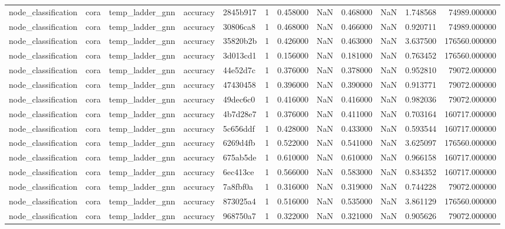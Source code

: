 \begin{tabular}{lllllrrrrrrr}
node_classification & cora & temp_ladder_gnn & accuracy & 2845b917 & 1 & 0.458000 & NaN & 0.468000 & NaN & 1.748568 & 74989.000000 \\
node_classification & cora & temp_ladder_gnn & accuracy & 30806ca8 & 1 & 0.468000 & NaN & 0.466000 & NaN & 0.920711 & 74989.000000 \\
node_classification & cora & temp_ladder_gnn & accuracy & 35820b2b & 1 & 0.426000 & NaN & 0.463000 & NaN & 3.637500 & 176560.000000 \\
node_classification & cora & temp_ladder_gnn & accuracy & 3d013cd1 & 1 & 0.156000 & NaN & 0.181000 & NaN & 0.763452 & 176560.000000 \\
node_classification & cora & temp_ladder_gnn & accuracy & 44e52d7c & 1 & 0.376000 & NaN & 0.378000 & NaN & 0.952810 & 79072.000000 \\
node_classification & cora & temp_ladder_gnn & accuracy & 47430458 & 1 & 0.396000 & NaN & 0.390000 & NaN & 0.913771 & 79072.000000 \\
node_classification & cora & temp_ladder_gnn & accuracy & 49dec6c0 & 1 & 0.416000 & NaN & 0.416000 & NaN & 0.982036 & 79072.000000 \\
node_classification & cora & temp_ladder_gnn & accuracy & 4b7d28e7 & 1 & 0.376000 & NaN & 0.411000 & NaN & 0.703164 & 160717.000000 \\
node_classification & cora & temp_ladder_gnn & accuracy & 5c656ddf & 1 & 0.428000 & NaN & 0.433000 & NaN & 0.593544 & 160717.000000 \\
node_classification & cora & temp_ladder_gnn & accuracy & 6269d4fb & 1 & 0.522000 & NaN & 0.541000 & NaN & 3.625097 & 176560.000000 \\
node_classification & cora & temp_ladder_gnn & accuracy & 675ab5de & 1 & 0.610000 & NaN & 0.610000 & NaN & 0.966158 & 160717.000000 \\
node_classification & cora & temp_ladder_gnn & accuracy & 6ec413ce & 1 & 0.566000 & NaN & 0.583000 & NaN & 0.834352 & 160717.000000 \\
node_classification & cora & temp_ladder_gnn & accuracy & 7a8fbf0a & 1 & 0.316000 & NaN & 0.319000 & NaN & 0.744228 & 79072.000000 \\
node_classification & cora & temp_ladder_gnn & accuracy & 873025a4 & 1 & 0.516000 & NaN & 0.535000 & NaN & 3.861129 & 176560.000000 \\
node_classification & cora & temp_ladder_gnn & accuracy & 968750a7 & 1 & 0.322000 & NaN & 0.321000 & NaN & 0.905626 & 79072.000000 \\

\end{tabular}
